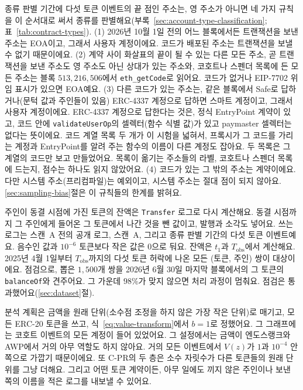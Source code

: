
종류 판별 기간에 다섯 토큰 이벤트의 끝 점인 주소는, 영 주소가 아니면 네 가지 규칙을 이 순서대로 써서 종류를 판별해요(부록~\ref{sec:account-type-classification}; 표~\ref{tab:contract-types}). (1) 2026년 10월 1일 전의 어느 블록에서든 트랜잭션을 보낸 주소는 EOA이고, 그래서 사용자 계정이에요. 코드가 배포된 주소는 트랜잭션을 보낼 수 없기 때문이에요\parencite{feist2021eip3607}. (2) 계약 사이 화살표의 끝이 될 수 있는 다른 모든 주소, 곧 트랜잭션을 보낸 주소도 영 주소도 아닌 상대가 있는 주소와, 코호트나 스펜더 목록에 든 모든 주소는 블록 $513{,}216{,}506$에서 \texttt{eth\_getCode}로 읽어요. 코드가 없거나 EIP-7702 위임 표시가 있으면 EOA예요. (3) 다른 코드가 있는 주소는, 같은 블록에서 Safe로 답하거나(문턱 값과 주인들이 있음) ERC-4337 계정으로 답하면 스마트 계정이고, 그래서 사용자 계정이에요. ERC-4337 계정으로 답한다는 것은, 정식 EntryPoint 계약이 있고, 코드 안에 \texttt{validateUserOp}의 셀렉터(함수 식별 값)가 있고 paymaster 셀렉터는 없다는 뜻이에요. 코드 계열 목록 두 개가 이 시험을 넓혀서, 프록시가 그 코드를 가리는 계정과 EntryPoint를 알려 주는 함수의 이름이 다른 계정도 잡아요. 두 목록은 그 계열의 코드만 보고 만들었어요. 목록이 옮기는 주소들의 라벨, 코호트나 스펜더 목록에 드는지, 점수는 하나도 읽지 않았어요. (4) 코드가 있는 그 밖의 주소는 계약이에요. 다만 시스템 주소(프리컴파일)는 예외이고, 시스템 주소는 절대 점이 되지 않아요. \ref{sec:sampling-bias}절은 이 규칙들의 한계를 밝혀요.


주인이 동결 시점에 가진 토큰의 잔액은 \texttt{Transfer} 로그로 다시 계산해요. 동결 시점까지 그 주인에게 들어온 그 토큰에서 나간 것을 뺀 값이고, 발행과 소각도 넣어요. 쓰는 로그는 스캔~A 전의 공개 로그, 스캔~A, 그리고 종류 판별 기간의 다섯 토큰 이벤트예요. 음수인 값과 $10^{-6}$ 토큰보다 작은 값은 0으로 둬요. 잔액은 $t_1$과 $T_{\mathrm{obs}}$에서 계산해요. 2025년 4월 1일부터 $T_{\mathrm{obs}}$까지의 다섯 토큰 허락에 나온 모든 (토큰, 주인) 쌍이 대상이에요. 점검으로, 뽑은 $1{,}500$개 쌍을 2026년 6월 30일 마지막 블록에서의 그 토큰의 \texttt{balanceOf}와 견주어요. 그 가운데 $98\%$가 맞지 않으면 처리 과정이 멈춰요. 점검은 통과했어요(\ref{sec:dataset}절).


분석 계획은 금액을 원래 단위(소수점 조정을 하지 않은 가장 작은 단위)로 매기고, 모든 ERC-20 토큰을 쓰고, 식~\eqref{eq:value-transform}에서 $b=1$로 정했어요. 그 그래프에는 코호트 이벤트의 모든 계정이 들어 있었어요. 그 설정에서는 금액이 엔도스랭크와 AWP에서 거의 아무 역할도 하지 않아요. 거의 모든 이벤트에서 $V(z)$가 $1$과 $10^{-4}$ 안쪽으로 가깝기 때문이에요. 또 \mbox{C-PR}의 두 층은 소수 자릿수가 다른 토큰들의 원래 단위를 그냥 더해요. 그리고 어떤 토큰 계약이든, 아무 일에도 끼지 않은 주인이나 보낸 쪽의 이름을 적은 로그를 내보낼 수 있어요.

